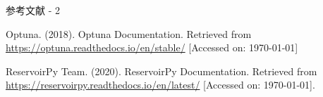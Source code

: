 \begin{frame}{参考文献 - 2}
    \begin{thebibliography}{99}    
        Optuna. (2018). Optuna Documentation. Retrieved from \url{https://optuna.readthedocs.io/en/stable/} [Accessed on: \today]

        ReservoirPy Team. (2020). ReservoirPy Documentation. Retrieved from \url{https://reservoirpy.readthedocs.io/en/latest/} [Accessed on: \today].

    \end{thebibliography}
\end{frame}

